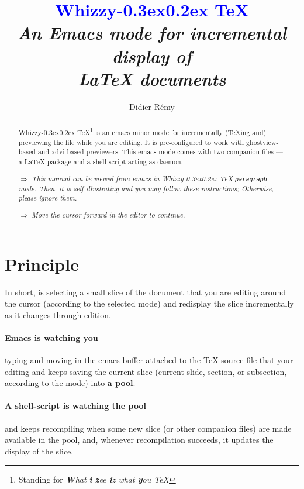 \documentclass{article}
\def \whizzy{{Whizzy\kern -0.3ex\raise 0.2ex \hbox{\TeX}}}
\def \Whizzy{\textbf {\textcolor {blue}{\whizzy}}}
\def \instruction #1{\par\medskip \noindent$\Rightarrow$ {\em #1}}
\begin{document}
\pagestyle {empty}

\author {Didier R{\'e}my}

\title {
{\huge \Whizzy}
\\[1em]
{\em An {\bfseries Emacs mode} 
for incremental display of \\ 
{\bfseries {\LaTeX} documents}}
}

\maketitle   


\begin{abstract}
\def \B{\textbf}
{\whizzy}\footnote {Standing for {\em {\B W}hat {\B i} {\B z}ee
{\B i}z what {\B y}ou {\expandafter \B \TeX}}} is an emacs minor mode for
incrementally ({\TeX}ing and) previewing the file while you are editing.
%
It is pre-configured to work with ghostview-based and xdvi-based previewers.
This emacs-mode comes with two companion files ---a {\LaTeX} package and a
shell script acting as daemon. 

\instruction 
{This manual can be viewed from emacs in {\whizzy} {\tt paragraph}
mode. Then, it is self-illustrating and you may follow these instructions;
Otherwise, please ignore them.}

\instruction {Move the cursor forward in the editor to continue.}
\end{abstract}

\section {Principle} 

In short, {\sc \whizzy} is selecting a small slice of the document that 
you are editing around the cursor (according to the selected mode) 
and redisplay the slice incrementally as it changes through edition. 

\paragraph {Emacs is watching you} typing and moving in the 
emacs buffer attached to the {\TeX} source file that your editing and keeps
saving the current slice (current slide, section, or subsection, according
to the mode) into {\bf a pool}.

\paragraph {A shell-script is watching the pool}
and keeps recompiling when some new slice (or other companion files) 
are made available in the pool, and, whenever recompilation succeeds, it 
updates the display of the slice. 
\end{document}
